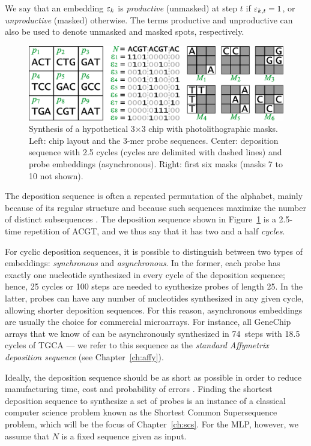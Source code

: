 We say that an embedding $\varepsilon_k$ is \emph{productive} (unmasked) at step $t$ if
$\varepsilon_{k,t} = 1$, or \emph{unproductive} (masked) otherwise. The terms
productive and unproductive can also be used to denote unmasked and masked
spots, respectively.

\begin{figure}[t]\centering
\centerline{\includegraphics[width=\textwidth]{figures/chip.eps}}
\caption{Synthesis of a hypothetical 3$\times$3 chip with photolithographic
  masks. Left: chip layout and the 3-mer probe sequences. Center: deposition
  sequence with 2.5 cycles (cycles are delimited with dashed lines) and probe
  embeddings (asynchronous). Right: first six masks (masks 7 to 10 not shown).}
\label{fig:masking_process}
\end{figure}

The deposition sequence is often a repeated permutation of the alphabet, mainly
because of its regular structure and because such sequences maximize the number
of distinct subsequences \citep{Chase1976}. The deposition sequence shown in
Figure~\ref{fig:masking_process} is a 2.5-time repetition of ACGT, and we thus
say that it has two and a half \emph{cycles}.

For cyclic deposition sequences, it is possible to distinguish between two types
of embeddings: \emph{synchronous} and \emph{asynchronous}. In the former, each
probe has exactly one nucleotide synthesized in every cycle of the deposition
sequence; hence, 25 cycles or 100 steps are needed to synthesize probes of
length 25. In the latter, probes can have any number of nucleotides synthesized
in any given cycle, allowing shorter deposition sequences. For this reason,
asynchronous embeddings are usually the choice for commercial microarrays.  For
instance, all GeneChip arrays that we know of can be asynchronously synthesized
in 74~steps with 18.5 cycles of TGCA --- we refer to this sequence as the
\emph{standard Affymetrix deposition sequence} (see Chapter~\ref{ch:affy}).

Ideally, the deposition sequence should be as short as possible in order to
reduce manufacturing time, cost and probability of errors \citep{Rahmann2003}.
Finding the shortest deposition sequence to synthesize a set of probes is an
instance of a classical computer science problem known as the Shortest Common
Supersequence problem, which will be the focus of Chapter~\ref{ch:scs}. For the
MLP, however, we assume that $N$ is a fixed sequence given as input.

